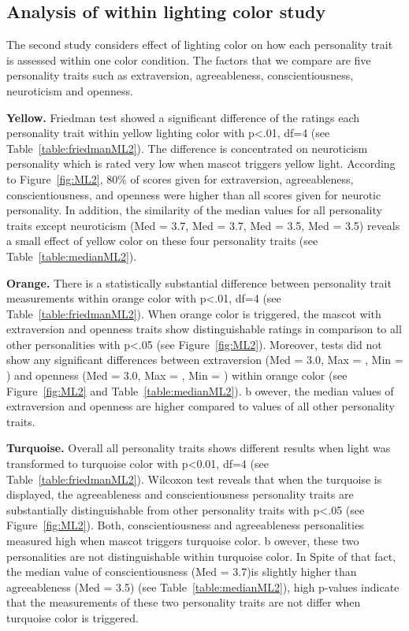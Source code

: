 \subsection{Analysis of within lighting color study}
\label{subsec:MLstudy2}
The second study considers effect of lighting color on how each
personality trait is assessed within one color condition.
The factors that we compare are five personality traits such as extraversion, agreeableness, conscientiousness,
neuroticism and openness.

\par\textbf{Yellow.}
Friedman test showed a significant difference of the ratings each personality trait
within yellow lighting color with p<.01, df=4 (see Table~\ref{table:friedmanML2}).
The difference is concentrated on neuroticism personality which is rated very low when mascot triggers yellow light.
According to Figure~\ref{fig:ML2}, 80\% of scores given for extraversion, agreeableness,
conscientiousness, and openness were higher than all scores given for neurotic personality.
In addition, the similarity of the median values for all personality traits except
neuroticism (Med = 3.7, Med = 3.7, Med = 3.5, Med = 3.5) reveals a small effect of yellow
color on these four personality traits (see Table~\ref{table:medianML2}).

\par\textbf{Orange.}
There is a statistically substantial difference between personality trait measurements within
orange color with p<.01, df=4 (see Table~\ref{table:friedmanML2}).
When orange color is triggered, the mascot with extraversion and openness traits
show distinguishable ratings in comparison to all other personalities with p<.05 (see Figure~\ref{fig:ML2}).
Moreover, tests did not show any significant differences between extraversion (Med = 3.0, Max = , Min = )
and openness (Med = 3.0, Max = , Min = ) within orange color (see Figure~\ref{fig:ML2} and Table~\ref{table:medianML2}).
b owever, the median values of extraversion and openness are higher compared to values of all other personality traits.

\par\textbf{Turquoise.}
Overall all personality traits shows different results when light was transformed to turquoise color
with p<0.01, df=4 (see Table~\ref{table:friedmanML2}).
Wilcoxon test reveals that when the turquoise is displayed, the agreeableness and conscientiousness
personality traits are substantially distinguishable from other personality traits with p<.05 (see Figure~\ref{fig:ML2}).
Both, conscientiousness and agreeableness personalities measured high when mascot triggers turquoise color.
b owever, these two personalities are not distinguishable within turquoise color.
In Spite of that fact, the median value of conscientiousness (Med = 3.7)is slightly higher than
agreeableness (Med = 3.5) (see Table~\ref{table:medianML2}), high p-values indicate that the measurements of
these two personality traits are not differ when turquoise color is triggered.

